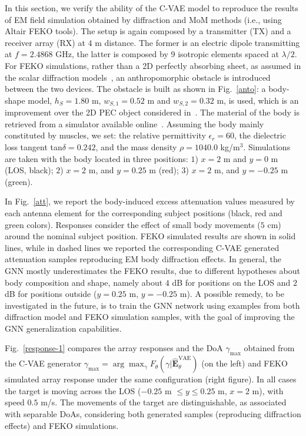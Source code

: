 In this section, we verify the ability of the C-VAE model to reproduce the results of EM field simulation obtained by diffraction and MoM methods (i.e., using Altair\textsuperscript{\textregistered} FEKO\textsuperscript{\textregistered} tools). The setup is again composed by a transmitter (TX) and a receiver array (RX) at $4$ m distance. The former is an electric dipole transmitting at $f=2.4868$ GHz, the latter is composed by 9 isotropic elements spaced at $\lambda/2$. For FEKO\textsuperscript{\textregistered} simulations, rather than a 2D perfectly absorbing sheet, as assumed in the scalar diffraction models~\cite{rampa-2022a}, an anthropomorphic obstacle is introduced between the two devices. The obstacle is built as shown in Fig.~\ref{anto}: a body-shape model, $h_{S}=1.80$ m, $w_{S,1}=0.52$ m and $w_{S,2}=0.32$ m, is used, which is an improvement over the 2D PEC object considered in~\cite{rampa-2017,rampa-2022a,generation,fieramosca-2023,fieramosca-2024,mimo}. The material of the body is retrieved from a simulator available online~\cite{material}. Assuming the body mainly constituted by muscles, we set: the relative permittivity $\epsilon_r= 60$, the dielectric loss tangent tan$\delta = 0.242$, and the mass density $\rho=1040.0$ kg/m$^3$. Simulations are taken with the body located in three positions: $1$) $x=2$ m and $y=0$ m (LOS, black); $2$) $x=2$ m, and $y=0.25$ m (red); $3$) $x=2$ m, and $y=-0.25$ m (green). 

In Fig.~\ref{att}, we report the body-induced excess attenuation values measured by each antenna element for the corresponding subject positions (black, red and green colors). Responses consider the effect of small body movements ($5$ cm) around the nominal subject position. FEKO\textsuperscript{\textregistered} simulated results are shown in solid lines, while in dashed lines we reported the corresponding C-VAE generated attenuation samples reproducing  EM body diffraction effects. In general, the GNN mostly underestimates the FEKO\textsuperscript{\textregistered} results, due to different hypotheses about body composition and shape, namely about $4$ dB for positions on the LOS and $2$ dB for positions outside ($y=0.25$ m, $y=-0.25$ m). A possible remedy, to be investigated in the future, is to train the GNN network using examples from both diffraction model and FEKO\textsuperscript{\textregistered} simulation samples, with the goal of improving the GNN generalization capabilities.

Fig.~\ref{response-1} compares the array responses and the DoA $\gamma_{\mathrm{max}}$ obtained from the C-VAE generator $\gamma_{\mathrm{max}}=\arg\max_{\gamma}F_{\theta}(\gamma|\widehat{\mathbf{E}}_{\theta}^{\mathrm{VAE}})$ (on the left) and FEKO\textsuperscript{\textregistered} simulated array response under the same configuration (right figure). In all cases the target is moving across the LOS ($-0.25$ m $\leq y\leq0.25$ m, $x=2$ m), with speed $0.5$ m/s. The movements of the target are distinguishable, as associated with separable DoAs, considering both generated samples (reproducing diffraction effects) and FEKO\textsuperscript{\textregistered} simulations.

